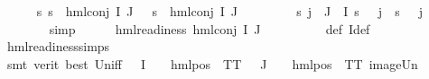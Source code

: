 \begin{isabellebody}
\ \ \ \ \isamarkupfalse%
\ {\isachardoublequoteopen}{\isacharparenleft}{\kern0pt}{\isasymforall}s{\isachardot}{\kern0pt}\ {\isacharparenleft}{\kern0pt}s\ {\isasymTurnstile}\ hml{\isacharunderscore}{\kern0pt}conj\ I\ J\ {\isasymPhi}{\isacharparenright}{\kern0pt}\ {\isacharequal}{\kern0pt}\ {\isacharparenleft}{\kern0pt}s\ {\isasymTurnstile}\ {\isacharparenleft}{\kern0pt}hml{\isacharunderscore}{\kern0pt}conj\ I{\isacharprime}{\kern0pt}\ J\ {\isasymPsi}{\isacharparenright}{\kern0pt}{\isacharparenright}{\kern0pt}{\isacharparenright}{\kern0pt}{\isachardoublequoteclose}\isanewline
\ \ \ \ \ \ \isamarkupfalse%
\ {\isacartoucheopen}{\isacharparenleft}{\kern0pt}{\isasymforall}s{\isachardot}{\kern0pt}\ {\isasymforall}j\ {\isasymin}\ J\ {\isasymunion}\ I{\isacharprime}{\kern0pt}{\isachardot}{\kern0pt}\ {\isacharparenleft}{\kern0pt}{\isasymnot}{\isacharparenleft}{\kern0pt}s\ {\isasymTurnstile}\ {\isacharparenleft}{\kern0pt}{\isasymPsi}\ j{\isacharparenright}{\kern0pt}{\isacharparenright}{\kern0pt}\ {\isacharequal}{\kern0pt}\ {\isacharparenleft}{\kern0pt}{\isasymnot}{\isacharparenleft}{\kern0pt}s\ {\isasymTurnstile}\ {\isacharparenleft}{\kern0pt}{\isasymPhi}\ j{\isacharparenright}{\kern0pt}{\isacharparenright}{\kern0pt}{\isacharparenright}{\kern0pt}{\isacharparenright}{\kern0pt}{\isacharparenright}{\kern0pt}{\isacartoucheclose}\isanewline
\ \ \ \ \ \ \isamarkupfalse%
\ simp\isanewline
\ \ \ \ \isamarkupfalse%
\ {\isachardoublequoteopen}hml{\isacharunderscore}{\kern0pt}readiness\ {\isacharparenleft}{\kern0pt}hml{\isacharunderscore}{\kern0pt}conj\ I{\isacharprime}{\kern0pt}\ J\ {\isasymPsi}{\isacharparenright}{\kern0pt}{\isachardoublequoteclose}\ \isanewline
\ \ \ \ \ \ \isamarkupfalse%
\ {\isasymPsi}{\isacharunderscore}{\kern0pt}def\ I{\isacharprime}{\kern0pt}{\isacharunderscore}{\kern0pt}def\isanewline
\ \ \ \ \ \ \isamarkupfalse%
\ hml{\isacharunderscore}{\kern0pt}readiness{\isachardot}{\kern0pt}simps\ \isanewline
\ \ \ \ \ \ \isamarkupfalse%
\ {\isacharparenleft}{\kern0pt}smt\ {\isacharparenleft}{\kern0pt}verit{\isacharcomma}{\kern0pt}\ best{\isacharparenright}{\kern0pt}\ Un{\isacharunderscore}{\kern0pt}iff\ {\isacartoucheopen}{\isasymforall}{\isasympsi}{\isasymin}{\isasymPsi}\ {\isacharbackquote}{\kern0pt}\ I{\isacharprime}{\kern0pt}{\isachardot}{\kern0pt}\ {\isasymexists}{\isasymalpha}{\isachardot}{\kern0pt}\ {\isasympsi}\ {\isacharequal}{\kern0pt}\ hml{\isacharunderscore}{\kern0pt}pos\ {\isasymalpha}\ TT{\isacartoucheclose}\ {\isacartoucheopen}{\isasymforall}{\isasympsi}{\isasymin}{\isasymPsi}\ {\isacharbackquote}{\kern0pt}\ J{\isachardot}{\kern0pt}\ {\isasymexists}{\isasymalpha}{\isachardot}{\kern0pt}\ {\isasympsi}\ {\isacharequal}{\kern0pt}\ hml{\isacharunderscore}{\kern0pt}pos\ {\isasymalpha}\ TT{\isacartoucheclose}\ image{\isacharunderscore}{\kern0pt}Un{\isacharparenright}{\kern0pt}\isanewline

\end{isabellebody}
